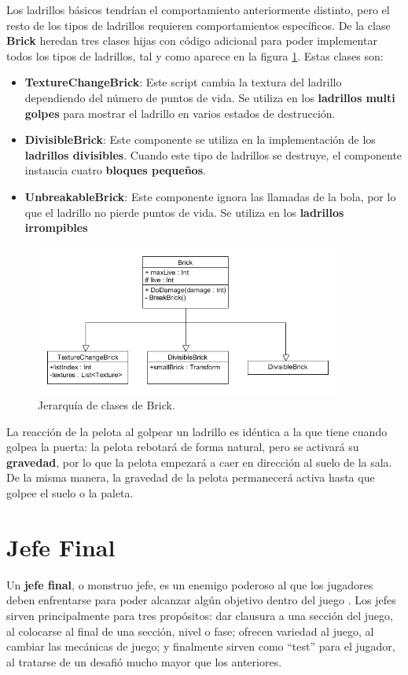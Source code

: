 Los ladrillos básicos tendrían el comportamiento anteriormente distinto, pero el resto de los tipos de ladrillos requieren comportamientos específicos. De la clase \textbf{Brick} heredan tres clases hijas con código adicional para poder implementar todos los tipos de ladrillos, tal y como aparece en la figura \ref{brick_classes}. Estas clases son:
\begin{itemize}
\item \textbf{TextureChangeBrick}: Este script cambia la textura del ladrillo dependiendo del número de puntos de vida. Se utiliza en los \textbf{ladrillos multi golpes} para mostrar el ladrillo en varios estados de destrucción.
\item \textbf{DivisibleBrick}: Este componente se utiliza en la implementación de los \textbf{ladrillos divisibles}. Cuando este tipo de ladrillos se destruye, el componente instancia cuatro \textbf{bloques pequeños}.
\item \textbf{UnbreakableBrick}: Este componente ignora las llamadas de la bola, por lo que el ladrillo no pierde puntos de vida. Se utiliza en los \textbf{ladrillos irrompibles}
\end{itemize}
\begin{figure}[h]
	\includegraphics[width=0.9\textwidth]{images/estructura/fisica/brick_classes}
	\centering
	\caption{Jerarquía de clases de Brick.}
	\label{brick_classes}
\end{figure}

La reacción de la pelota al golpear un ladrillo es idéntica a la que tiene cuando golpea la puerta: la pelota rebotará de forma natural, pero se activará su \textbf{gravedad}, por lo que la pelota empezará a caer en dirección al suelo de la sala. De la misma manera, la gravedad de la pelota permanecerá activa hasta que golpee el suelo o la paleta.

\section{Jefe Final}
Un \textbf{jefe final}, o monstruo jefe, es un enemigo poderoso al que los jugadores deben enfrentarse para poder alcanzar algún objetivo dentro del juego \cite{game_design_patterns}. Los jefes sirven principalmente para tres propósitos: dar clausura a una sección del juego, al colocarse al final de una sección, nivel o fase; ofrecen variedad al juego, al cambiar las mecánicas de juego; y finalmente sirven como ``test'' para el jugador, al tratarse de un desafió mucho mayor que los anteriores. 


